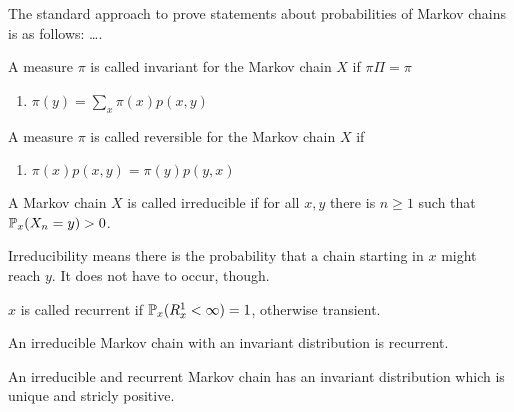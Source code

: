 \begin{remark}
    The standard approach to prove statements about probabilities of Markov chains is as follows: \dots.
\end{remark}



\begin{defn}
    A measure $\pi$ is called invariant for the Markov chain $X$ if \(\pi \Pi = \pi\)
    \begin{enumerate}
      \item \(\pi(y) = \sum_x \pi(x) p(x,y) \)
    \end{enumerate}
    
\end{defn}

\begin{defn}
    A measure $\pi$ is called reversible for the Markov chain $X$ if 
    \begin{enumerate}
      \item \(\pi(x)p(x,y) = \pi(y)p(y,x)\)
    \end{enumerate}
    
\end{defn}

\begin{defn}
    A Markov chain $X$ is called irreducible if for all $x,y$ there is $n\geq 1$ such that $\mathbb{P}_x(X_n=y)>0$.
\end{defn}

\begin{remark}
    Irreducibility means there is the probability that a chain starting in $x$ might reach $y$. It does not have to occur, though.
\end{remark}

\begin{defn}
    $x$ is called recurrent if $\mathbb{P}_x(R_x^1<\infty)=1$, otherwise transient.
\end{defn}

\begin{thm}
    An irreducible Markov chain with an invariant distribution is recurrent.
\end{thm}

\begin{thm}
    An irreducible and recurrent Markov chain has an invariant distribution which is unique and stricly positive.
\end{thm}

